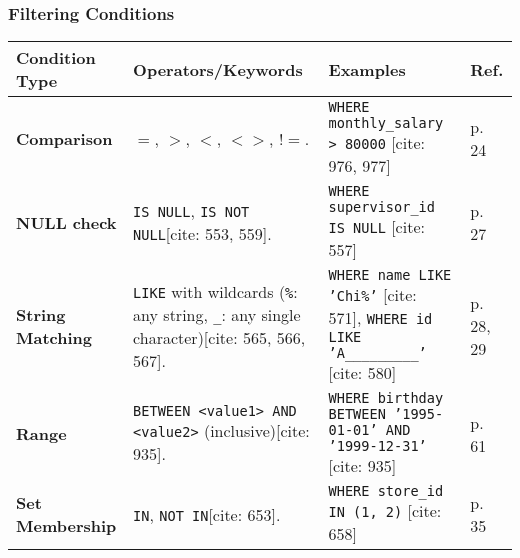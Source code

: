 \documentclass[12pt,a4paper]{article}
\begin{document}
\subsubsection*{Filtering Conditions}
\begin{longtable}{>{\bfseries}p{} p{} p{} p{}}
\toprule
\textbf{Condition Type} & \textbf{Operators/Keywords} & \textbf{Examples} & \textbf{Ref.} \\
\midrule
\endhead
\textbf{Comparison} & $=$, $>$, $<$, $<>$, $!=$. & \texttt{WHERE monthly\_salary > 80000} [cite: 976, 977] & p. 24 \\
\textbf{NULL check} & \texttt{IS NULL}, \texttt{IS NOT NULL}[cite: 553, 559]. & \texttt{WHERE supervisor\_id IS NULL} [cite: 557] & p. 27 \\
\textbf{String Matching} & \texttt{LIKE} with wildcards (\texttt{\%}: any string, \texttt{\_}: any single character)[cite: 565, 566, 567]. & \texttt{WHERE name LIKE 'Chi\%'} [cite: 571], \texttt{WHERE id LIKE 'A\_\_\_\_\_\_\_\_\_'} [cite: 580] & p. 28, 29 \\
\textbf{Range} & \texttt{BETWEEN \textless value1\textgreater\ AND \textless value2\textgreater} (inclusive)[cite: 935]. & \texttt{WHERE birthday BETWEEN '1995-01-01' AND '1999-12-31'} [cite: 935] & p. 61 \\
\textbf{Set Membership} & \texttt{IN}, \texttt{NOT IN}[cite: 653]. & \texttt{WHERE store\_id IN (1, 2)} [cite: 658] & p. 35 \\
\bottomrule
\end{longtable}

\vspace{0.5cm}
\end{document}
